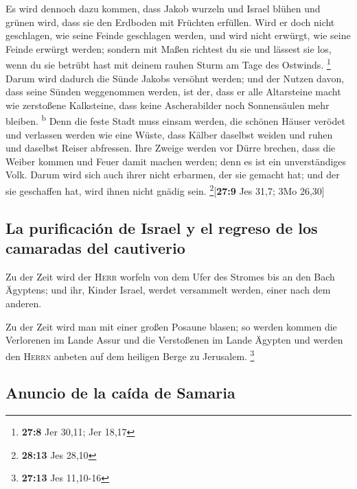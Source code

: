  Es wird dennoch dazu kommen, dass Jakob wurzeln und
Israel blühen und grünen wird, dass sie den Erdboden mit Früchten
erfüllen.  Wird er doch nicht geschlagen, wie seine Feinde
geschlagen werden, und wird nicht erwürgt, wie seine Feinde erwürgt
werden;  sondern mit Maßen richtest du sie und lässest sie
los, wenn du sie betrübt hast mit deinem rauhen Sturm am Tage des
Ostwinds. \footnote{\textbf{27:8} Jer 30,11; Jer 18,17} 
Darum wird dadurch die Sünde Jakobs versöhnt werden; und der Nutzen
davon, dass seine Sünden weggenommen werden, ist der, dass er alle
Altarsteine macht wie zerstoßene Kalksteine, dass keine Ascherabilder
noch Sonnensäulen mehr bleiben. \textsuperscript{b}  Denn
die feste Stadt muss einsam werden, die schönen Häuser verödet und
verlassen werden wie eine Wüste, dass Kälber daselbst weiden und ruhen
und daselbst Reiser abfressen.  Ihre Zweige werden vor
Dürre brechen, dass die Weiber kommen und Feuer damit machen werden;
denn es ist ein unverständiges Volk. Darum wird sich auch ihrer nicht
erbarmen, der sie gemacht hat; und der sie geschaffen hat, wird ihnen
nicht gnädig sein. \footnote{\textbf{28:13} Jes 28,10}{[}\textbf{27:9}
Jes 31,7; 3Mo 26,30{]}

\hypertarget{la-purificaciuxf3n-de-israel-y-el-regreso-de-los-camaradas-del-cautiverio}{%
\subsection{La purificación de Israel y el regreso de los camaradas del
cautiverio}\label{la-purificaciuxf3n-de-israel-y-el-regreso-de-los-camaradas-del-cautiverio}}

 Zu der Zeit wird der \textsc{Herr} worfeln von dem Ufer
des Stromes bis an den Bach Ägyptens; und ihr, Kinder Israel, werdet
versammelt werden, einer nach dem anderen.

 Zu der Zeit wird man mit einer großen Posaune blasen; so
werden kommen die Verlorenen im Lande Assur und die Verstoßenen im Lande
Ägypten und werden den \textsc{Herrn} anbeten auf dem heiligen Berge zu
Jerusalem. \footnote{\textbf{27:13} Jes 11,10-16}

\hypertarget{anuncio-de-la-cauxedda-de-samaria}{%
\subsection{Anuncio de la caída de
Samaria}\label{anuncio-de-la-cauxedda-de-samaria}}

